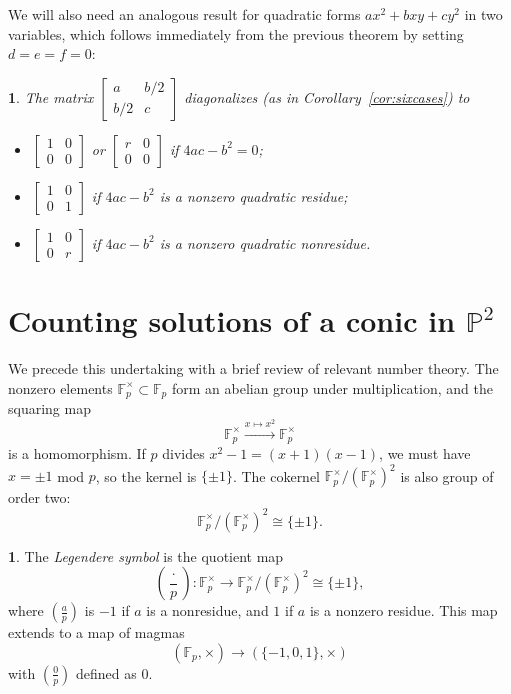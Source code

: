 \documentclass[10pt,a4paper]{amsart}
\numberwithin{equation}{section}
\numberwithin{figure}{section}
\theoremstyle{definition}
\theoremstyle{remark}
\theoremstyle{plain}
\theoremstyle{plain}
\newtheorem{cor}{\protect\corollaryname}[section]
\theoremstyle{definition}
\newtheorem{defn}{\protect\definitionname}[section]
\theoremstyle{plain}
\theoremstyle{plain}
\providecommand{\definitionname}{Definition}
\providecommand{\corollaryname}{Corollary}
\newcommand{\legendre}[2]{\genfrac{(}{)}{}{}{#1}{#2}}
\renewcommand{\P}{\mathbb{P}}
\newcommand{\F}{\mathbb{F}}
\begin{document}
We will also need an analogous result for quadratic forms $ax^2+bxy+cy^2$ in two variables, which follows immediately from the previous theorem by setting $d=e=f=0$:
\begin{cor}
The matrix $\left[\begin{smallmatrix}a&b/2\\b/2&c\end{smallmatrix}\right]$ diagonalizes (as in Corollary~\ref{cor:sixcases}) to
\begin{itemize}
\item $\left[\begin{smallmatrix}1&0\\0&0\end{smallmatrix}\right]$ or $\left[\begin{smallmatrix}r&0\\0&0\end{smallmatrix}\right]$ if $4ac-b^2=0$;
\item $\left[\begin{smallmatrix}1&0\\0&1\end{smallmatrix}\right]$ if $4ac-b^2$ is a nonzero quadratic residue;
\item $\left[\begin{smallmatrix}1&0\\0&r\end{smallmatrix}\right]$ if $4ac-b^2$ is a nonzero quadratic nonresidue.
\end{itemize}
\end{cor}

    \section{Counting solutions of a conic in $\P^2$} 

    We precede this undertaking with a brief review of relevant number theory.
    The nonzero elements $\F_p^\times \subset \F_p$ form an abelian
    group under multiplication, and the squaring map 
    \[ \F^\times_p \xrightarrow{x \mapsto x^2} \F^\times_p \] 
    is a homomorphism. If $p$ divides $x^2 - 1 = (x+1)(x-1)$, we must have 
    $x = \pm 1$ mod $p$, so the kernel is $\{\pm 1\}$. 
    The cokernel $\F_p^\times / (\F_p^\times)^2$ is also group of order two: 
    \[ \F_p^\times / (\F_p^\times)^2 \cong \{\pm 1\}.  \]
    \begin{defn}
        The \emph{Legendere symbol} is the quotient map    
        \[ \legendre{\cdot}{p}: 
            \F_p^\times \to \F_p^\times / (\F_p^\times)^2 \cong \{\pm 1\}, \]
        where $\legendre{a}{p}$ is $-1$ if $a$ is a nonresidue,
        and $1$ if $a$ is a nonzero residue. This map extends to a map of magmas
        \[ (\F_p,\times) \to (\{-1,0,1\}, \times) \]
        with $\legendre{0}{p}$ defined as $0$.
    \end{defn}
    
\end{document}
